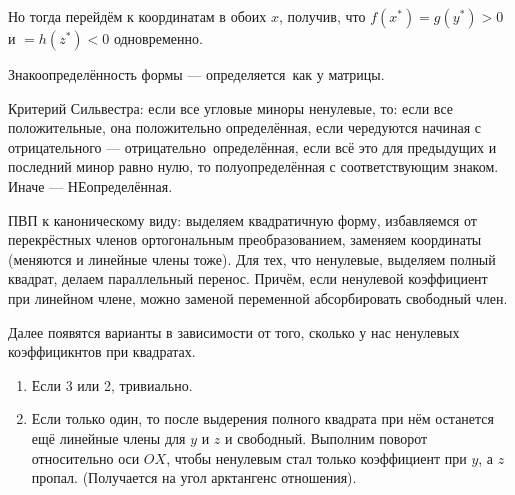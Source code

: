 \documentclass[12pt, a4paper]{article}
\begin{document}
Но тогда перейдём к координатам в обоих $x$, получив, что $f(x^*) = g(y^*) > 0$ и $= h(z^*) < 0$ одновременно. 

Знакоопределённость формы — определяется как у матрицы.

Критерий Сильвестра: если все угловые миноры ненулевые, то: 
если все положительные, она положительно определённая, если чередуются начиная с отрицательного — отрицательно определённая,
если всё это для предыдущих и последний минор равно нулю, то полуопределённая с соответствующим знаком. Иначе — НЕопределённая.

ПВП к каноническому виду: выделяем квадратичную форму, избавляемся от перекрёстных членов ортогональным преобразованием, заменяем координаты (меняются и линейные члены тоже).
Для тех, что ненулевые, выделяем полный квадрат, делаем параллельный перенос. Причём, если ненулевой коэффициент при линейном члене, можно заменой переменной абсорбировать свободный член.

Далее появятся варианты в зависимости от того, сколько у нас ненулевых коэффицикнтов при квадратах.

\begin{enumerate}
    \item Если 3 или 2, тривиально.
    \item Если только один, то после выдерения полного квадрата при нём останется ещё линейные члены для $y$ и $z$ и свободный. 
    Выполним поворот относительно оси $OX$, чтобы ненулевым стал только коэффициент при $y$, а $z$ пропал. (Получается на угол арктангенс отношения).
\end{enumerate}
\end{document}
